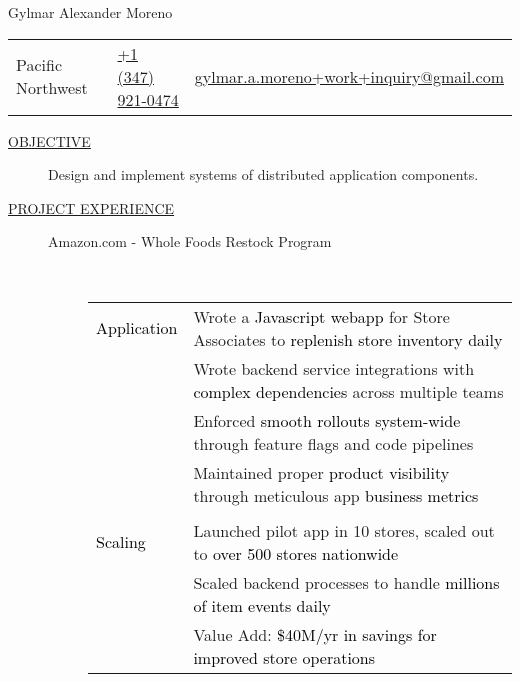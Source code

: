 \documentclass[12pt]{article}
\begin{document}
    \begin{center}
        {\LARGE Gylmar Alexander Moreno}
	\\
        \begin{tabular}{l|l|l}
            Pacific Northwest
            & \href{tel:+13479210474}{+1 (347) 921-0474}
            & \href{mailto:gylmar.a.moreno+work+inquiry@gmail.com}{gylmar.a.moreno+work+inquiry@gmail.com}
        \end{tabular}
    \end{center}

    \begin{description}
        \item[\underline{OBJECTIVE}] Design and implement systems of distributed application components.
        \item[\underline{PROJECT EXPERIENCE}] \hfill
            \begin{description}
                \item[Amazon.com - Whole Foods Restock Program] \hfill \\
                \textcolor{gray}{
                    \begin{tabular}{l|l}
                        \\[-1.0mm]
                        \textcolor{black}{Application}
                            & Wrote a \textcolor{black}{Javascript webapp} for Store Associates to \textcolor{black}{replenish store inventory daily}\\
                            & Wrote backend service integrations with \textcolor{black}{complex dependencies} across multiple teams\\
                            & Enforced \textcolor{black}{smooth rollouts system-wide} through feature flags and code pipelines \\
                            & Maintained proper \textcolor{black}{product visibility} through meticulous app \textcolor{black}{business metrics} \\
                        \\[-1.7mm]
                        \textcolor{black}{Scaling}
                            & Launched pilot app in 10 stores, scaled out to \textcolor{black}{over 500 stores nationwide}\\
                            & Scaled backend processes to handle \textcolor{black}{millions of item events daily}\\
                            & Value Add: \textcolor{black}{\$40M/yr in savings for improved store operations}\\

\end{tabular}}
\end{description}
\end{description}
\end{document}
